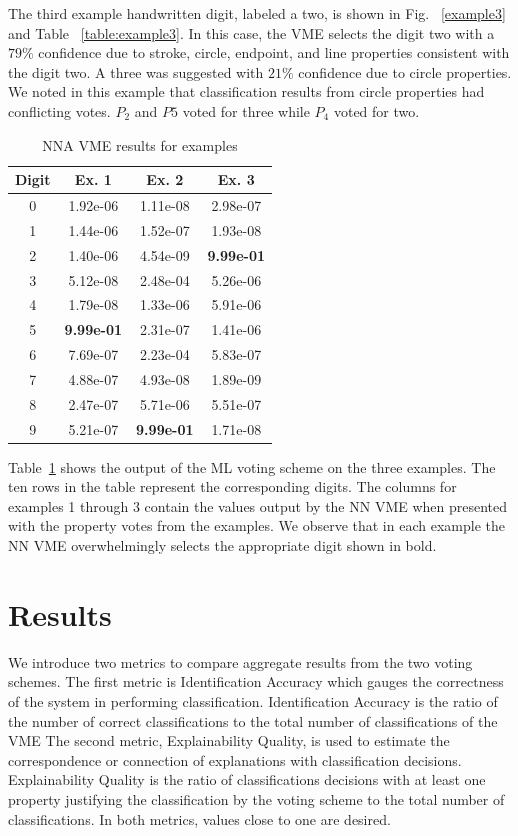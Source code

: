 \documentclass[conference]{IEEEtran}
\begin{document}
The third example handwritten digit, labeled a two, is shown in Fig. ~\ref{example3} and Table ~\ref{table:example3}.  In this case,  the VME selects the digit two with a $79\%$ confidence due to stroke, circle, endpoint, and line properties consistent with the digit two.  A three was suggested with $21\%$ confidence due to circle properties.  We noted in this example that classification results from circle properties had conflicting votes.  $P_2$ and $P5$ voted for three while $P_4$ voted for two.

\begin{table}[htbp]
\caption{NNA VME results for examples}
\centering
\begin{tabular}{| c | c | c | c |}
\hline
 Digit & Ex. 1 & Ex. 2 & Ex. 3 \\
\hline\hline
0 & 1.92e-06 & 1.11e-08 & 2.98e-07\\ 
\hline
1 & 1.44e-06 & 1.52e-07 & 1.93e-08 \\
\hline
2 & 1.40e-06 & 4.54e-09 & \textbf{9.99e-01} \\
\hline
3 & 5.12e-08 & 2.48e-04 & 5.26e-06 \\
\hline
4 & 1.79e-08 & 1.33e-06 & 5.91e-06 \\
\hline
5 & \textbf{9.99e-01} & 2.31e-07 & 1.41e-06 \\
\hline
6 & 7.69e-07 & 2.23e-04 & 5.83e-07 \\
\hline
7 & 4.88e-07 & 4.93e-08 & 1.89e-09 \\
\hline
8 & 2.47e-07 & 5.71e-06 & 5.51e-07 \\
\hline
9 & 5.21e-07 & \textbf{9.99e-01} & 1.71e-08 \\
\hline
\end{tabular}
\label{table:nnavoter}
\end{table}

Table~\ref{table:nnavoter} shows the output of the ML voting scheme on the three examples.  The ten rows in the table represent the corresponding digits.  The columns for examples 1 through 3 contain the values output by the NN VME when presented with the property votes from the examples.  We observe that in each example the NN VME overwhelmingly selects the appropriate digit shown in bold.

\section{Results}

We introduce two metrics to compare aggregate results from the two voting schemes.  The first metric is Identification Accuracy which gauges the correctness of the system in performing classification.  Identification Accuracy is the ratio of the number of correct classifications to the total number of classifications of the VME  The second metric, Explainability Quality, is used to estimate the correspondence or connection of explanations with classification decisions.  Explainability Quality is the ratio of classifications decisions with at least one property justifying the classification by the voting scheme to the total number of classifications.   In both metrics, values close to one are desired.
\end{document}
